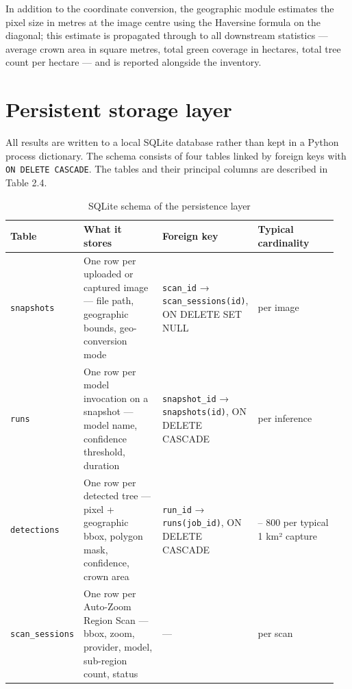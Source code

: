 In addition to the coordinate conversion, the geographic module estimates the pixel size in metres at the image centre using the Haversine formula on the diagonal; this estimate is propagated through to all downstream statistics --- average crown area in square metres, total green coverage in hectares, total tree count per hectare --- and is reported alongside the inventory.

\section{Persistent storage layer}\label{persistent-storage-layer}

All results are written to a local SQLite database rather than kept in a Python process dictionary. The schema consists of four tables linked by foreign keys with \texttt{ON\ DELETE\ CASCADE}. The tables and their principal columns are described in Table 2.4.

\begin{longtable}[]{@{}>{\raggedright\arraybackslash}p{0.128\linewidth} >{\raggedright\arraybackslash}p{0.274\linewidth} >{\raggedright\arraybackslash}p{0.274\linewidth} >{\raggedright\arraybackslash}p{0.274\linewidth}@{}}
\caption{SQLite schema of the persistence layer}\\
\endfirsthead

\toprule\noalign{}
\textbf{Table} & \textbf{What it stores} & \textbf{Foreign key} & \textbf{Typical cardinality} \\
\midrule\noalign{}
\endhead
\bottomrule\noalign{}
\endlastfoot
\texttt{snapshots} & One row per uploaded or captured image --- file path, geographic bounds, geo-conversion mode & \texttt{scan\_id} → \texttt{scan\_sessions(id)}, ON DELETE SET NULL & 1 per image \\
\texttt{runs} & One row per model invocation on a snapshot --- model name, confidence threshold, duration & \texttt{snapshot\_id} → \texttt{snapshots(id)}, ON DELETE CASCADE & 1 per inference \\
\texttt{detections} & One row per detected tree --- pixel + geographic bbox, polygon mask, confidence, crown area & \texttt{run\_id} → \texttt{runs(job\_id)}, ON DELETE CASCADE & 300 -- 800 per typical 1 km² capture \\
\texttt{scan\_sessions} & One row per Auto-Zoom Region Scan --- bbox, zoom, provider, model, sub-region count, status & --- & 1 per scan \\
\end{longtable}

